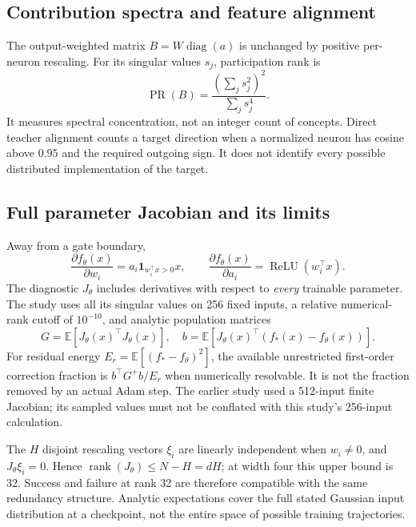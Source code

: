 \documentclass[11pt,letterpaper]{article}
\theoremstyle{remark}\newtheorem{remark}{Remark}
\newcommand{\E}{\mathbb E}
\newcommand{\relu}{\operatorname{ReLU}}
\newcommand{\diag}{\operatorname{diag}}
\newcommand{\rank}{\operatorname{rank}}
\begin{document}
\subsection{Contribution spectra and feature alignment}
The output-weighted matrix $B=W\diag(a)$ is unchanged by positive per-neuron rescaling. For its singular values $s_j$, participation rank is
\begin{equation}
\operatorname{PR}(B)=\frac{\left(\sum_j s_j^2\right)^2}{\sum_j s_j^4}.
\end{equation}
It measures spectral concentration, not an integer count of concepts. Direct teacher alignment counts a target direction when a normalized neuron has cosine above $0.95$ and the required outgoing sign. It does not identify every possible distributed implementation of the target.

\subsection{Full parameter Jacobian and its limits}
Away from a gate boundary,
\begin{equation}
\frac{\partial f_\theta(x)}{\partial w_i}
=a_i\mathbf1_{w_i^\top x>0}x,\qquad
\frac{\partial f_\theta(x)}{\partial a_i}=\relu(w_i^\top x).
\end{equation}
The diagnostic $J_\theta$ includes derivatives with respect to \emph{every} trainable parameter. The study uses all its singular values on 256 fixed inputs, a relative numerical-rank cutoff of $10^{-10}$, and analytic population matrices
\begin{equation}
G=\E[J_\theta(x)^\top J_\theta(x)],\quad
b=\E[J_\theta(x)^\top(f_*(x)-f_\theta(x))].
\end{equation}
For residual energy $E_r=\E[(f_*-f_\theta)^2]$, the available unrestricted first-order correction fraction is $b^\top G^+b/E_r$ when numerically resolvable. It is not the fraction removed by an actual Adam step. The earlier study used a 512-input finite Jacobian; its sampled values must not be conflated with this study's 256-input calculation.

The $H$ disjoint rescaling vectors $\xi_i$ are linearly independent when $w_i\ne0$, and $J_\theta\xi_i=0$. Hence $\rank(J_\theta)\le N-H=dH$; at width four this upper bound is 32. Success and failure at rank 32 are therefore compatible with the same redundancy structure. Analytic expectations cover the full stated Gaussian input distribution at a checkpoint, not the entire space of possible training trajectories.
\end{document}
